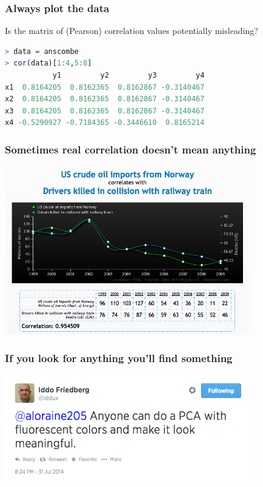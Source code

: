 \begin{frame}[fragile]
  \frametitle{Always plot the data}
    Is the matrix of (Pearson) correlation values potentially misleading?
\begin{lstlisting}[language=R]
> data = anscombe
> cor(data)[1:4,5:8]
           y1         y2         y3         y4
x1  0.8164205  0.8162365  0.8162867 -0.3140467
x2  0.8164205  0.8162365  0.8162867 -0.3140467
x3  0.8164205  0.8162365  0.8162867 -0.3140467
x4 -0.5290927 -0.7184365 -0.3446610  0.8165214
\end{lstlisting}
\end{frame}

\begin{frame}
  \frametitle{Sometimes real correlation doesn't mean anything}
  \begin{center}
    \includegraphics[width=0.8\textwidth]{images/spurious_correlation} \\
  \end{center}
\end{frame}

\begin{frame}
  \frametitle{If you look for anything you'll find something}
  \begin{center}
    \includegraphics[width=0.8\textwidth]{images/twitter_pca} \\
  \end{center}
\end{frame}

